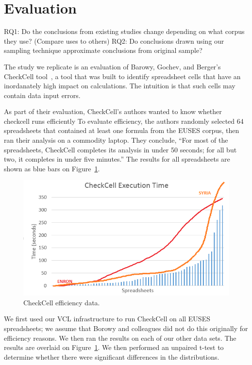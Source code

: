 \documentclass[conference]{IEEEtran}
\begin{document}
\section{Evaluation}

RQ1: Do the conclusions from existing studies change depending on what corpus they use? (Compare uses to others)
RQ2: Do conclusions drawn using our sampling technique approximate conclusions from original sample?

The study we replicate is an evaluation of Barowy, Gochev, and Berger's
CheckCell tool~\cite{barowy14}, a tool that was built to identify spreadsheet
cells that have an inordanately high impact on calculations.
The intuition is that such cells may contain data input errors.

As part of their evaluation, CheckCell's authors wanted to know whether checkcell runs efficiently
To evaluate efficiency, the authors randomly selected 64 spreadsheets that contained at least one
formula from the EUSES corpus, then ran their analysis on a commodity laptop.
They conclude, ``For most of the spreadsheets, CheckCell completes its analysis in under 50 seconds;
for all but two, it completes in under five minutes.''
The results for all spreadsheets are shown as blue bars on Figure~\ref{fig:effectiveness}.


\begin{figure}[!t]
\centering
\includegraphics[width=\columnwidth]{checkcell.png}
\caption{CheckCell efficiency data.}
\label{fig:effectiveness}
\end{figure}

We first used our VCL infrastructure to run CheckCell on all EUSES spreadsheets; we assume
that Borowy and colleagues did not do this originally for efficiency reasons.
We then ran the results on each of our other data sets.
The results are overlaid on Figure~\ref{fig:effectiveness}.
We then performed an unpaired t-test to determine whether there were significant differences
in the distributions.
\end{document}

